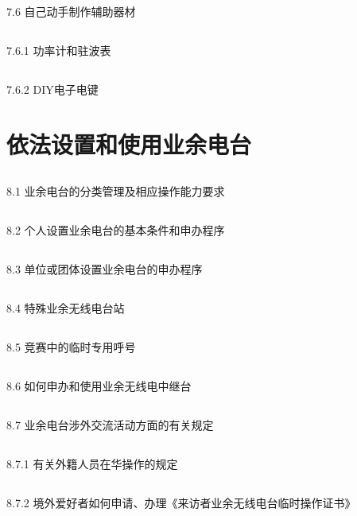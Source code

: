 \documentclass[12pt,UTF8]{ctexbook}
\begin{document}
\section{}7.6 自己动手制作辅助器材
\section{}7.6.1 功率计和驻波表
\section{}7.6.2 DIY电子电键

\chapter{依法设置和使用业余电台}

\section{}8.1 业余电台的分类管理及相应操作能力要求
\section{}8.2 个人设置业余电台的基本条件和申办程序
\section{}8.3 单位或团体设置业余电台的申办程序
\section{}8.4 特殊业余无线电台站
\section{}8.5 竞赛中的临时专用呼号
\section{}8.6 如何申办和使用业余无线电中继台
\section{}8.7 业余电台涉外交流活动方面的有关规定
\section{}8.7.1 有关外籍人员在华操作的规定
\section{}8.7.2 境外爱好者如何申请、办理《来访者业余无线电台临时操作证书》
\end{document}
